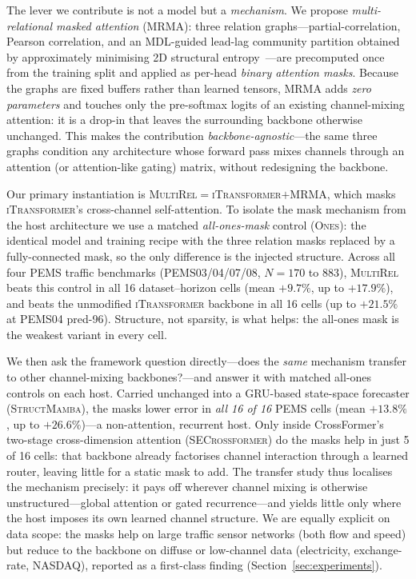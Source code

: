 \documentclass[letterpaper]{article}   %
\newcommand{\mr}{\textsc{MultiRel}}
\newcommand{\itrans}{\textsc{iTransformer}}
\begin{document}
The lever we contribute is not a model but a \emph{mechanism}.
We propose \emph{multi-relational masked attention} (MRMA): three relation
graphs---partial-correlation, Pearson correlation, and an MDL-guided lead-lag
community partition obtained by approximately minimising 2D structural
entropy~\cite{li2016structural}---are precomputed once from the training split
and applied as per-head \emph{binary attention masks}.
Because the graphs are fixed buffers rather than learned tensors, MRMA adds
\emph{zero parameters} and touches only the pre-softmax logits of an existing
channel-mixing attention: it is a drop-in that leaves the surrounding backbone
otherwise unchanged.
This makes the contribution \emph{backbone-agnostic}---the same three graphs
condition any architecture whose forward pass mixes channels through an
attention (or attention-like gating) matrix, without redesigning the backbone.

Our primary instantiation is \mr{}${=}$\itrans{}${+}$MRMA, which masks
\itrans{}'s cross-channel self-attention. To isolate the mask mechanism from the
host architecture we use a matched \emph{all-ones-mask} control (\textsc{Ones}):
the identical model and training recipe with the three relation masks replaced by
a fully-connected mask, so the only difference is the injected structure.
Across all four PEMS traffic benchmarks (PEMS03/04/07/08, $N{=}170$ to $883$),
\mr{} beats this control in all 16 dataset--horizon cells (mean $+9.7\%$, up to
$+17.9\%$), and beats the unmodified \itrans{} backbone in all 16 cells (up to
$+21.5\%$ at PEMS04 pred-96). Structure, not sparsity, is what helps: the
all-ones mask is the weakest variant in every cell.

We then ask the framework question directly---does the \emph{same} mechanism
transfer to other channel-mixing backbones?---and answer it with matched
all-ones controls on each host. Carried unchanged into a GRU-based state-space
forecaster (\textsc{StructMamba}), the masks lower error in \emph{all 16 of 16}
PEMS cells (mean $+13.8\%$, up to $+26.6\%$)---a non-attention, recurrent host.
Only inside CrossFormer's~\cite{zhang2023crossformer} two-stage cross-dimension
attention (\textsc{SECrossformer}) do the masks help in just 5 of 16 cells:
that backbone already factorises channel interaction through a learned router,
leaving little for a static mask to add. The transfer study thus localises the
mechanism precisely: it pays off wherever channel mixing is otherwise
unstructured---global attention or gated recurrence---and yields little only
where the host imposes its own learned channel structure. We are equally
explicit on data scope: the masks help on large traffic sensor networks (both
flow and speed) but reduce to the backbone on diffuse or low-channel data
(electricity, exchange-rate, NASDAQ), reported as a first-class finding
(Section~\ref{sec:experiments}).
\end{document}
